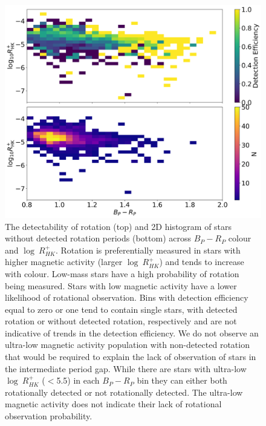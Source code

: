 \begin{figure}
\centering
  \includegraphics[width=\textwidth]{Figures/rot_gap_figures/detection_efficiency.png}
  \caption{
  	The detectability of rotation (top) and 2D histogram of stars without detected rotation periods (bottom) across \gaia{} $B_P - R_P$ colour and $\log \ R^{+}_{HK}$. 
	Rotation is preferentially measured in stars with higher magnetic activity (larger $\log \ R^{+}_{HK}$) and tends to increase with colour. Low-mass stars have a high probability of rotation being measured. Stars with low magnetic activity have a lower likelihood of rotational observation. 
Bins with detection efficiency equal to zero or one tend to contain single stars, with detected rotation or without detected rotation, respectively and are not indicative of trends in the detection efficiency.
	We do not observe an ultra-low magnetic activity population with non-detected rotation that would be required to explain the lack of observation of stars in the intermediate period gap.
	While there are stars with ultra-low $\log \ R^{+}_{HK}$ ($<$5.5) in each $B_P-R_P$ bin they can either both rotationally detected or not rotationally detected. The ultra-low magnetic activity does not indicate their lack of rotational observation probability.
}
  \label{fig:detection_efficiency_rhk}
\end{figure}


